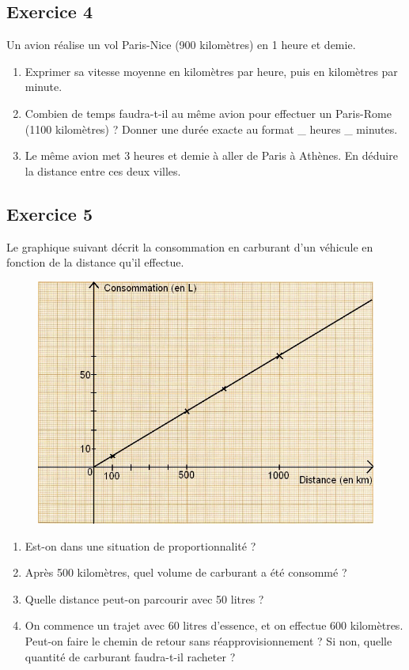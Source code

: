 \documentclass[12 pt]{extarticle}
\theoremstyle{plain}
\begin{document}
\subsection*{Exercice 4}
Un avion réalise un vol Paris-Nice (900 kilomètres) en 1 heure et demie. 
\begin{enumerate}
\item Exprimer sa vitesse moyenne en kilomètres par heure, puis en kilomètres par minute. 
\item Combien de temps faudra-t-il au même avion pour effectuer un Paris-Rome (1100 kilomètres) ? Donner une durée exacte au format \_ heures \_ minutes. 
 
 \item Le même avion met $3$ heures et demie à aller de Paris à Athènes. En déduire la distance entre ces deux villes.  
\end{enumerate}

\subsection*{Exercice 5}
Le graphique suivant décrit la consommation en carburant d'un véhicule en fonction de la distance qu'il effectue.
\begin{figure}[H]
\center
\includegraphics[scale=0.4]{Graphique}
\end{figure}

\begin{enumerate}
\item Est-on dans une situation de proportionnalité ?
\item Après 500 kilomètres, quel volume de carburant a été consommé ? 
\item Quelle distance peut-on parcourir avec 50 litres ?
\item On commence un trajet avec 60 litres d'essence, et on effectue 600 kilomètres. Peut-on faire le chemin de retour sans réapprovisionnement ? Si non, quelle quantité de carburant faudra-t-il racheter ?
\end{enumerate}
\end{document}
